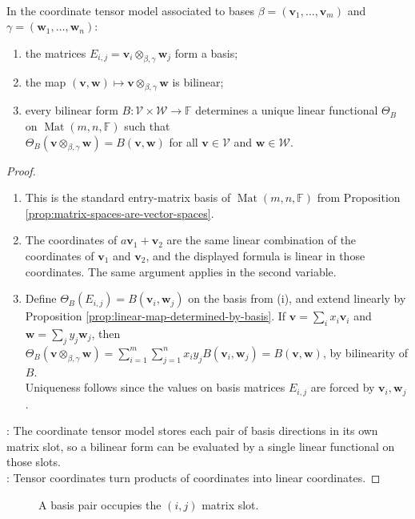 \begin{proposition} \label{prop:tensor-product-matrix-basis-model} \\
In the coordinate tensor model associated to bases $\beta=(\mathbf{v}_1,\ldots,\mathbf{v}_m)$ and $\gamma=(\mathbf{w}_1,\ldots,\mathbf{w}_n)$:
\begin{enumerate}[label=(\roman*)]
\setlength{\itemsep}{0pt}
\item the matrices $E_{i,j}=\mathbf{v}_i\otimes_{\beta,\gamma}\mathbf{w}_j$ form a basis;
\item the map $(\mathbf{v},\mathbf{w})\mapsto\mathbf{v}\otimes_{\beta,\gamma}\mathbf{w}$ is bilinear;
\item every bilinear form $B:\mathcal{V}\times\mathcal{W}\to\mathbb{F}$ determines a unique linear functional $\Theta_B$ on $\operatorname{Mat}(m,n,\mathbb{F})$ such that\\
$\Theta_B(\mathbf{v}\otimes_{\beta,\gamma}\mathbf{w})=B(\mathbf{v},\mathbf{w})$ for all $\mathbf{v}\in\mathcal{V}$ and $\mathbf{w}\in\mathcal{W}$.
\end{enumerate}
\begin{proof}
\begin{enumerate}[label=(\roman*)]
\setlength{\itemsep}{0pt}
\item This is the standard entry-matrix basis of $\operatorname{Mat}(m,n,\mathbb{F})$ from Proposition \ref{prop:matrix-spaces-are-vector-spaces}.
\item The coordinates of $a\mathbf{v}_1+\mathbf{v}_2$ are the same linear combination of the coordinates of $\mathbf{v}_1$ and $\mathbf{v}_2$, and the displayed formula is linear in those coordinates. The same argument applies in the second variable.
\item Define $\Theta_B(E_{i,j})=B(\mathbf{v}_i,\mathbf{w}_j)$ on the basis from (i), and extend linearly by Proposition \ref{prop:linear-map-determined-by-basis}. If $\mathbf{v}=\sum_i x_i\mathbf{v}_i$ and $\mathbf{w}=\sum_j y_j\mathbf{w}_j$, then $\Theta_B(\mathbf{v}\otimes_{\beta,\gamma}\mathbf{w}) =\sum\limits_{i=1}^m\sum\limits_{j=1}^n x_i y_j B(\mathbf{v}_i,\mathbf{w}_j) =B(\mathbf{v},\mathbf{w})$, by bilinearity of $B$.\\
Uniqueness follows since the values on basis matrices $E_{i,j}$ are forced by $\mathbf{v}_i,\mathbf{w}_j$.
\end{enumerate}
: The coordinate tensor model stores each pair of basis directions in its own matrix slot, so a bilinear form can be evaluated by a single linear functional on those slots.\\
: Tensor coordinates turn products of coordinates into linear coordinates.
\end{proof}
\end{proposition}

\begin{figure}[H]
  \centering
  
  \caption{A basis pair occupies the $(i,j)$ matrix slot.}
  \label{fig:tensor-product-matrix-basis}
\end{figure}
